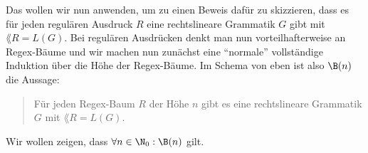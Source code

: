 

Das wollen wir nun anwenden, um zu einen Beweis dafür zu skizzieren,
dass es für jeden regulären Ausdruck $R$ eine rechtslineare Grammatik
$G$ gibt mit $\lang{R}=L(G)$.
%
Bei regulären Ausdrücken denkt man nun vorteilhafterweise an
Regex-Bäume und wir machen nun zunächst eine "`normale"' vollständige
Induktion über die Höhe der Regex-Bäume. Im Schema von eben ist also
$\B(n)$ die Aussage:

\begin{quote}
  Für jeden Regex-Baum $R$ der Höhe $n$ gibt es eine rechtslineare
  Grammatik $G$ mit $\lang{R}=L(G)$.
\end{quote}
%
Wir wollen zeigen, dass $\forall n\in\N_0: \B(n)$ gilt.

